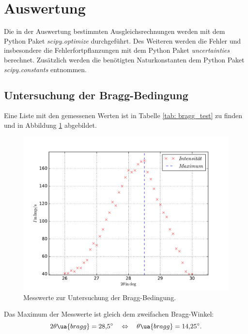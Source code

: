 \section{Auswertung}
Die in der Auswertung bestimmten Ausgleichsrechnungen werden mit
dem Python Paket \emph{scipy.optimize}\cite{scipy} durchgeführt.
Des Weiteren werden die Fehler und insbesondere die Fehlerfortpflanzungen
mit dem Python Paket \emph{uncertainties}\cite{uncertainties} berechnet.
Zusätzlich werden die benötigten Naturkonstanten dem Python Paket \emph{scipy.constants}\cite{scipy}
entnommen.
\FloatBarrier
\subsection{Untersuchung der Bragg-Bedingung}
Eine Liste mit den gemessenen Werten ist in Tabelle \ref{tab: bragg_test} zu finden und in Abbildung \ref{fig: bragg_plot} abgebildet.

\begin{figure}
  \centering
  \includegraphics[width=0.8 \textwidth]{../Messdaten/bragbed.pdf}
  \caption{Messwerte zur Untersuchung der Bragg-Bedingung.}
  \label{fig: bragg_plot}
\end{figure}
Das Maximum der Messwerte ist gleich dem zweifachen Bragg-Winkel:
\begin{equation}
  \label{eq:bestimmt_bragg_winkel}
  2\theta\ua{bragg}=\SI{28.5}{\degree} \quad \Leftrightarrow \quad \theta\ua{bragg}=\SI{14.25}{\degree}.
\end{equation}
\FloatBarrier

\FloatBarrier
